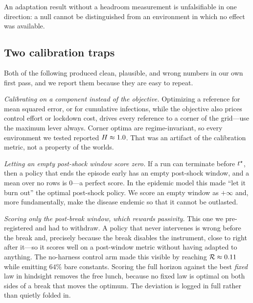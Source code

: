\documentclass[11pt]{article}
\begin{document}
\begin{takeaway}
An adaptation result without a headroom measurement is unfalsifiable in one direction: a null cannot
be distinguished from an environment in which no effect was available.
\end{takeaway}

\subsection{Two calibration traps}
\label{sec:traps}

Both of the following produced clean, plausible, and wrong numbers in our own first pass, and we
report them because they are easy to repeat.

\emph{Calibrating on a component instead of the objective.} Optimizing a reference for mean squared
error, or for cumulative infections, while the objective also prices control effort or lockdown
cost, drives every reference to a corner of the grid---use the maximum lever always. Corner optima
are regime-invariant, so every environment we tested reported $H \approx 1.0$. That was an
artifact of the calibration metric, not a property of the worlds.

\emph{Letting an empty post-shock window score zero.} If a run can terminate before $t^{\star}$,
then a policy that ends the episode early has an empty post-shock window, and a mean over no rows is
$0$---a perfect score. In the epidemic model this made ``let it burn out'' the optimal post-shock
policy. We score an empty window as $+\infty$ and, more fundamentally, make the disease endemic so
that it cannot be outlasted.

\emph{Scoring only the post-break window, which rewards passivity.} This one we pre-registered and
had to withdraw. A policy that never intervenes is wrong before the break and, precisely because the
break disables the instrument, close to right after it---so it scores well on a post-window metric
without having adapted to anything. The no-harness control arm made this visible by reaching
$\mathcal{R} \approx 0.11$ while emitting $64\%$ bare constants. Scoring the full horizon against the best
\emph{fixed} law in hindsight removes the free lunch, because no fixed law is optimal on both sides
of a break that moves the optimum. The deviation is logged in full rather than quietly folded in.
\end{document}
